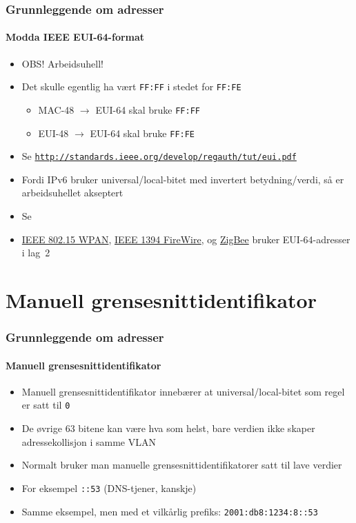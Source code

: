 \begin{frame}%
  \frametitle{Grunnleggende om adresser}
  \framesubtitle{Modda IEEE EUI-64-format}
  \begin{itemize}%
  \item OBS! Arbeidsuhell!
  \item Det skulle egentlig ha vært \texttt{FF:FF} i stedet for
    \texttt{FF:FE}
    \begin{itemize}
    \item MAC-48 \(\to\) EUI-64 skal bruke \texttt{FF:FF}
    \item EUI-48 \(\to\) EUI-64 skal bruke \texttt{FF:FE}
    \end{itemize}
  \item Se \texttt{\url{http://standards.ieee.org/develop/regauth/tut/eui.pdf}}
  \item Fordi IPv6 bruker universal/local-bitet med invertert
    betydning/verdi, så er arbeidsuhellet akseptert
  \item Se 
  \item \href{http://en.wikipedia.org/wiki/IEEE_802.15}{IEEE 802.15
      WPAN}, \href{http://en.wikipedia.org/wiki/IEEE_1394}{IEEE 1394
      FireWire}, og \href{http://en.wikipedia.org/wiki/ZigBee}{ZigBee}
    bruker EUI-64-adresser i lag~2
  \end{itemize}
\end{frame}

\section{Manuell grensesnittidentifikator}
\begin{frame}%
  \frametitle{Grunnleggende om adresser}
  \framesubtitle{Manuell grensesnittidentifikator}
  \begin{itemize}%
  \item Manuell grensesnittidentifikator innebærer at
    universal/local-bitet som regel er satt til \texttt{0}
  \item De øvrige 63 bitene kan være hva som helst, bare verdien ikke
    skaper adressekollisjon i samme VLAN
  \item Normalt bruker man manuelle grensesnittidentifikatorer satt
    til lave verdier
  \item For eksempel \texttt{::53} \hfill(DNS-tjener, kanskje)
  \item Samme eksempel, men med et vilkårlig prefiks:
    \texttt{2001:db8:1234:8::\alert{53}}
  \end{itemize}
\end{frame}

